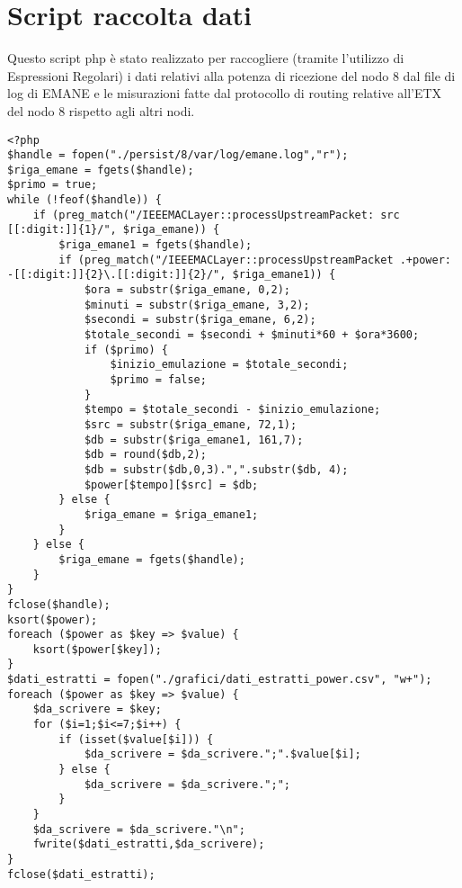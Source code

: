 \section{Script raccolta dati}
\label{app:script_raccolta}

Questo script php è stato realizzato per raccogliere (tramite l'utilizzo di Espressioni Regolari) i dati relativi alla potenza di ricezione del nodo 8 dal file di log di EMANE e le misurazioni fatte dal protocollo di routing relative all'ETX del nodo 8 rispetto agli altri nodi. \\

\lstset{language=PHP}
\begin{lstlisting}
<?php
$handle = fopen("./persist/8/var/log/emane.log","r");
$riga_emane = fgets($handle);
$primo = true;
while (!feof($handle)) {
	if (preg_match("/IEEEMACLayer::processUpstreamPacket: src [[:digit:]]{1}/", $riga_emane)) {
		$riga_emane1 = fgets($handle);
		if (preg_match("/IEEEMACLayer::processUpstreamPacket .+power: -[[:digit:]]{2}\.[[:digit:]]{2}/", $riga_emane1)) {
			$ora = substr($riga_emane, 0,2);
			$minuti = substr($riga_emane, 3,2);
			$secondi = substr($riga_emane, 6,2);
			$totale_secondi = $secondi + $minuti*60 + $ora*3600;
			if ($primo) {
				$inizio_emulazione = $totale_secondi;
				$primo = false;
			}
			$tempo = $totale_secondi - $inizio_emulazione;
			$src = substr($riga_emane, 72,1);
			$db = substr($riga_emane1, 161,7);
			$db = round($db,2);
			$db = substr($db,0,3).",".substr($db, 4);
			$power[$tempo][$src] = $db;
		} else {
			$riga_emane = $riga_emane1;
		}
	} else {
		$riga_emane = fgets($handle);
	}
}
fclose($handle);
ksort($power);
foreach ($power as $key => $value) {
	ksort($power[$key]);
}
$dati_estratti = fopen("./grafici/dati_estratti_power.csv", "w+");
foreach ($power as $key => $value) {
	$da_scrivere = $key;
	for ($i=1;$i<=7;$i++) {
		if (isset($value[$i])) {
			$da_scrivere = $da_scrivere.";".$value[$i];
		} else {
			$da_scrivere = $da_scrivere.";";
		}
	}
	$da_scrivere = $da_scrivere."\n";
	fwrite($dati_estratti,$da_scrivere);
}
fclose($dati_estratti);


\end{lstlisting}
